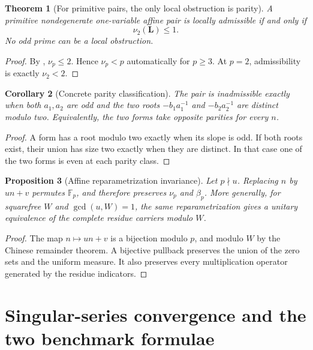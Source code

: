 \documentclass[11pt]{article}
\newtheorem{theorem}{Theorem}[section]
\newtheorem{proposition}[theorem]{Proposition}
\newtheorem{corollary}[theorem]{Corollary}
\theoremstyle{definition}
\theoremstyle{remark}
\newcommand{\F}{\mathbb F}
\begin{document}
\begin{theorem}[For primitive pairs, the only local obstruction is parity]
\label{thm:parity-only-local}
A primitive nondegenerate one-variable affine pair is locally admissible if
and only if
\[
 \boxed{\nu_2(\bm L)\le1.}
 \tag{3.8}
\]
No odd prime can be a local obstruction.
\end{theorem}

\begin{proof}
By , $\nu_p\le2$.  Hence $\nu_p<p$ automatically for
$p\ge3$.  At $p=2$, admissibility is exactly $\nu_2<2$.
\end{proof}

\begin{corollary}[Concrete parity classification]
\label{cor:parity-classification}
The pair is inadmissible exactly when both $a_1,a_2$ are odd and the two roots
$-b_1a_1^{-1}$ and $-b_2a_2^{-1}$ are distinct modulo two.  Equivalently, the
two forms take opposite parities for every $n$.
\end{corollary}

\begin{proof}
A form has a root modulo two exactly when its slope is odd.  If both roots
exist, their union has size two exactly when they are distinct.  In that case
one of the two forms is even at each parity class.
\end{proof}

\begin{proposition}[Affine reparametrization invariance]
\label{prop:affine-invariance}
Let $p\nmid u$.  Replacing $n$ by $un+v$ permutes $\F_p$, and therefore
preserves $\nu_p$ and $\beta_p$.  More generally, for squarefree $W$ and
$\gcd(u,W)=1$, the same reparametrization gives a unitary equivalence of the
complete residue carriers modulo $W$.
\end{proposition}

\begin{proof}
The map $n\mapsto un+v$ is a bijection modulo $p$, and modulo $W$ by the
Chinese remainder theorem.  A bijective pullback preserves the union of the
zero sets and the uniform measure.  It also preserves every multiplication
operator generated by the residue indicators.
\end{proof}

\section{Singular-series convergence and the two benchmark formulae}
\label{sec:singular-series}
\end{document}
